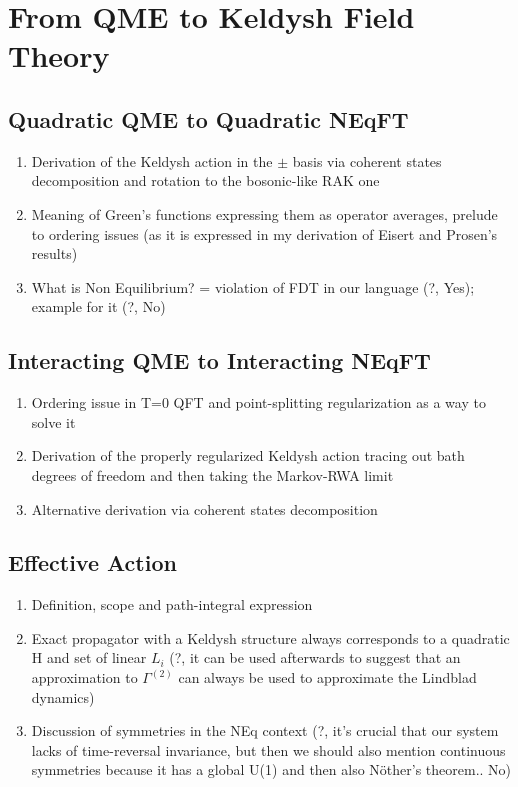 \documentclass[a4paper,10pt]{article}
\theoremstyle{remark}
\newcommand{\nsec}{\vskip 0.8cm}
\begin{document}
 \section{From QME to Keldysh Field Theory}
  \subsection{Quadratic QME to Quadratic NEqFT}
   \begin{enumerate}
    \item Derivation of the Keldysh action in the $\pm$ basis  via coherent states decomposition and rotation to the bosonic-like RAK one
    \item Meaning of Green's functions expressing them as operator averages, prelude to ordering issues (as it is expressed in my derivation of Eisert and Prosen's results)
    \item What is Non Equilibrium? = violation of FDT in our language (?, Yes); example for it (?, No)
   \end{enumerate}
  \subsection{Interacting QME to Interacting NEqFT}
   \begin{enumerate}
    \item Ordering issue in T=0 QFT and point-splitting regularization as a way to solve it 
    \item Derivation of the properly regularized Keldysh action tracing out bath degrees of freedom and then taking the Markov-RWA limit
    \item Alternative derivation via coherent states decomposition      
   \end{enumerate}
  \subsection{Effective Action}
   \begin{enumerate}
    \item Definition, scope and path-integral expression
    \item Exact propagator with a Keldysh structure always corresponds to a quadratic H and set of linear $L_i$ (?, it can be used afterwards to suggest that an approximation to $\Gamma^{(2)}$ can always be used to approximate the Lindblad dynamics) 
    \item Discussion of symmetries in the NEq context (?, it's crucial that our system lacks of time-reversal invariance, but then we should also mention continuous symmetries because it has a global U(1) and then also Nöther's theorem.. No)
   \end{enumerate}
  \nsec 
  
\end{document}
